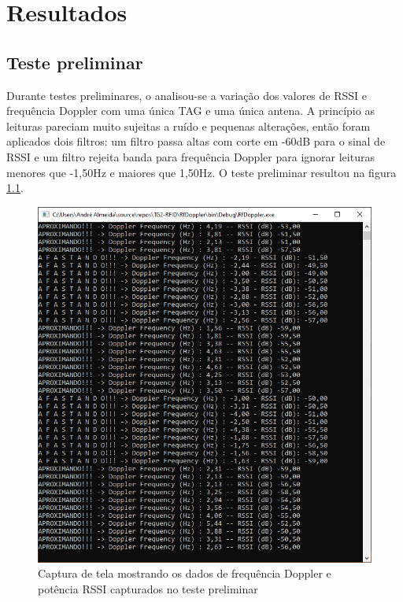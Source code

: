 
\chapter{Resultados\label{chap:Resultados}}



\section{Teste preliminar} \label{sect:testepreliminar}

Durante testes preliminares, o analisou-se a variação dos valores de RSSI e frequência Doppler com uma única TAG e uma única antena. A princípio as leituras pareciam muito sujeitas a ruído e pequenas alterações, então foram aplicados dois filtros: um filtro passa altas com corte em -60dB para o sinal de RSSI e um filtro rejeita banda para frequência Doppler para ignorar leituras menores que -1,50Hz e maiores que 1,50Hz. O teste preliminar resultou na figura \ref{fig:teste_preliminar}.
 
 \begin{figure}[ht]
    \centering
    \includegraphics[width=0.7\linewidth]{figs/Metodologia/teste_doppler+RSSI_corte_60db.PNG}
    \caption{Captura de tela mostrando os dados de frequência Doppler e potência RSSI capturados no teste preliminar}
    \label{fig:teste_preliminar}
\end{figure}
 
